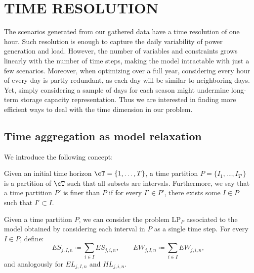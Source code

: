 \documentclass[smallextended,natbib]{svjour3}       %
\numberwithin{theorem}{section}
\begin{document}
\section{TIME RESOLUTION}\label{section:time-resolution}


The scenarios generated from our gathered data have a time resolution of one hour. 
Such resolution is enough to capture the daily variability of power generation and load. 
However, the number of variables and constraints grows linearly with the number of time steps, making the model intractable with just a few scenarios.
Moreover, when optimizing over a full year, considering every hour of every day is partly redundant, as each day will be similar to neighboring days. 
Yet, simply considering a sample of days for each season might undermine long-term storage capacity representation. 
Thus we are interested in finding more efficient ways to deal with the time dimension in our problem.

\subsection{Time aggregation as model relaxation}\label{subsection: relax}

We introduce the following concept:
\begin{definition}
Given an initial time horizon \(\cT = \{1, \ldots, T\}\), a time partition \(P=\{I_1,...,I_{T'}\}\) is a partition of \(\cT\) such that all subsets are intervals. 
Furthermore, we say that a time partition \(P'\) is finer than \(P\) if for every \(I' \in P'\), there exists some \(I \in P\) such that \(I' \subset I\).
\end{definition}

Given a time partition $P$, we can consider the problem LP\(_P\) associated to the model obtained by considering each interval in \(P\) as a single time step. 
For every \(I\in P\), define:
\begin{equation}\label{sums scenarios}
ES_{j,I,n} \coloneqq \sum_{i \in I} ES_{j,i,n}, \quad\quad EW_{j,I,n} \coloneqq \sum_{i \in I} EW_{j,i,n}, 
\end{equation}
and analogously for $EL_{j,I,n}$ and $HL_{j,i,n}$.
\end{document}
